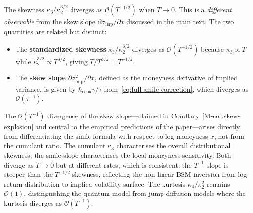 The skewness $\kappa_3 / \kappa_2^{3/2}$ diverges as $\mathcal{O}(T^{-1/2})$
when $T \to 0$. This is a \emph{different observable} from the skew slope
$\partial \sigma_{\mathrm{imp}}/\partial x$ discussed in the main text. The
two quantities are related but distinct:

\begin{itemize}
\item The \textbf{standardized skewness} $\kappa_3/\kappa_2^{3/2}$
  diverges as $\mathcal{O}(T^{-1/2})$ because $\kappa_3 \propto T$ while
  $\kappa_2^{3/2} \propto T^{3/2}$, giving $T/T^{3/2} = T^{-1/2}$.

\item The \textbf{skew slope} $\partial\sigma_{\mathrm{imp}}^2/\partial x$,
  defined as the moneyness derivative of implied variance, is given by
  $\hbar_{\mathrm{econ}}\gamma/\tau$ from~\eqref{eq:full-smile-correction},
  which diverges as $\mathcal{O}(\tau^{-1})$.
\end{itemize}

The $\mathcal{O}(T^{-1})$ divergence of the skew slope---claimed in
Corollary~\ref{M-cor:skew-explosion} and central to the empirical predictions
of the paper---arises directly from differentiating the smile formula with
respect to log-moneyness $x$, not from the cumulant ratio. The cumulant
$\kappa_3$ characterises the overall distributional skewness; the smile
slope characterises the local moneyness sensitivity. Both diverge as
$T \to 0$ but at different rates, which is consistent: the $T^{-1}$ slope
is steeper than the $T^{-1/2}$ skewness, reflecting the non-linear BSM
inversion from log-return distribution to implied volatility surface.
The kurtosis $\kappa_4 / \kappa_2^2$ remains $\mathcal{O}(1)$, distinguishing the quantum model from
jump-diffusion models where the kurtosis diverges as $\mathcal{O}(T^{-1})$.
